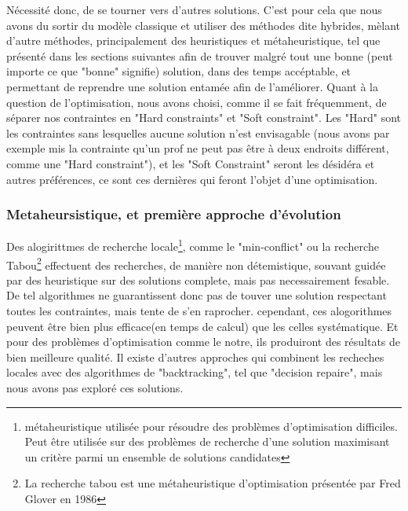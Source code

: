 Nécessité donc, de se tourner vers d'autres solutions.
\newline
\indent
C'est pour cela que nous avons du sortir du modèle classique et utiliser des méthodes dite hybrides, mèlant d'autre méthodes, principalement des heuristiques et métaheuristique, tel que présenté dans les sections suivantes afin de trouver malgré tout une bonne (peut importe ce que "bonne" signifie) solution, dans des temps accéptable, et permettant de reprendre une solution entamée afin de l'améliorer. \newline
Quant à la question de l'optimisation, nous avons choisi, comme il se fait fréquemment, de séparer nos contraintes en "Hard constraints" et "Soft constraint".  Les "Hard" sont les contraintes sans lesquelles aucune solution n'est envisagable (nous avons par exemple mis la contrainte qu'un prof ne peut pas être à deux endroits différent, comme une "Hard constraint"), et les "Soft Constraint" seront les désidéra et autres préférences, ce sont ces dernières qui feront l'objet d'une optimisation. 
\subsubsection{Metaheursistique, et première approche d'évolution}
Des alogirittmes de recherche locale\footnote{métaheuristique utilisée pour résoudre des problèmes d'optimisation difficiles. Peut être utilisée sur des problèmes de recherche d'une solution maximisant un critère parmi un ensemble de solutions candidates}, comme le "min-conflict" ou la recherche Tabou\footnote{La recherche tabou est une métaheuristique d'optimisation présentée par Fred Glover en 1986} effectuent des recherches, de manière non détemistique, souvant guidée par des heuristique sur des solutions complete, mais pas necessairement fesable.  
De tel algorithmes ne guarantissent donc pas de touver une solution respectant toutes les contraintes, mais tente de s'en raprocher. cependant, ces alogorithmes peuvent être bien plus efficace(en temps de calcul) que les celles systématique. Et pour des problèmes d'optimisation comme le notre, ils produiront des résultats de bien meilleure qualité.
Il existe d'autres approches qui combinent les recheches locales avec des algorithmes de "backtracking", tel que "decision repaire", mais nous avons pas exploré ces solutions.

